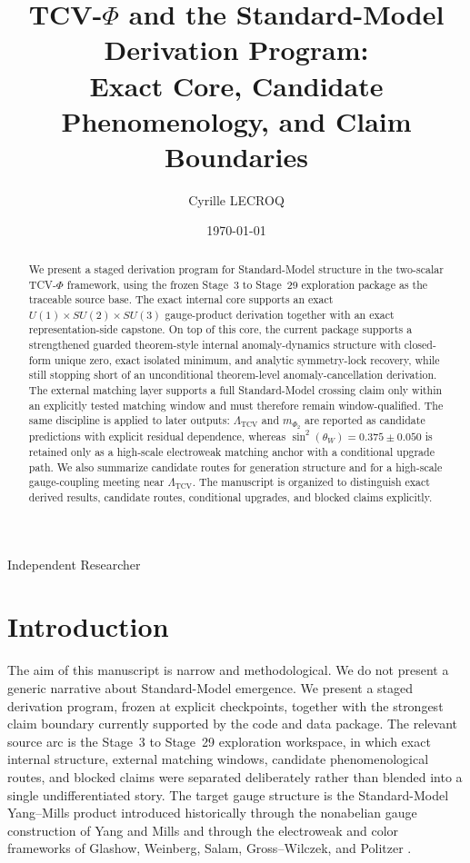 \documentclass[11pt]{article}
\title{TCV-$\Phi$ and the Standard-Model Derivation Program:\\Exact Core, Candidate Phenomenology, and Claim Boundaries}
\author{Cyrille LECROQ}
\date{\today}
\newcommand{\authoraffiliation}{Independent Researcher}
\begin{document}
\maketitle
\begin{center}
\authoraffiliation
\end{center}

\begin{abstract}
We present a staged derivation program for Standard-Model structure in the two-scalar TCV-$\Phi$ framework, using the frozen Stage~3 to Stage~29 exploration package as the traceable source base. The exact internal core supports an exact $U(1)\times SU(2)\times SU(3)$ gauge-product derivation together with an exact representation-side capstone. On top of this core, the current package supports a strengthened guarded theorem-style internal anomaly-dynamics structure with closed-form unique zero, exact isolated minimum, and analytic symmetry-lock recovery, while still stopping short of an unconditional theorem-level anomaly-cancellation derivation. The external matching layer supports a full Standard-Model crossing claim only within an explicitly tested matching window and must therefore remain window-qualified. The same discipline is applied to later outputs: $\Lambda_{\mathrm{TCV}}$ and $m_{\Phi_2}$ are reported as candidate predictions with explicit residual dependence, whereas $\sin^2(\theta_W)=0.375\pm0.050$ is retained only as a high-scale electroweak matching anchor with a conditional upgrade path. We also summarize candidate routes for generation structure and for a high-scale gauge-coupling meeting near $\Lambda_{\mathrm{TCV}}$. The manuscript is organized to distinguish exact derived results, candidate routes, conditional upgrades, and blocked claims explicitly.
\end{abstract}

\section{Introduction}
The aim of this manuscript is narrow and methodological. We do not present a generic narrative about Standard-Model emergence. We present a staged derivation program, frozen at explicit checkpoints, together with the strongest claim boundary currently supported by the code and data package. The relevant source arc is the Stage~3 to Stage~29 exploration workspace, in which exact internal structure, external matching windows, candidate phenomenological routes, and blocked claims were separated deliberately rather than blended into a single undifferentiated story. The target gauge structure is the Standard-Model Yang--Mills product introduced historically through the nonabelian gauge construction of Yang and Mills and through the electroweak and color frameworks of Glashow, Weinberg, Salam, Gross--Wilczek, and Politzer \cite{YangMills1954,Glashow1961,Weinberg1967,Salam1968,GrossWilczek1973,Politzer1973}.
\end{document}
